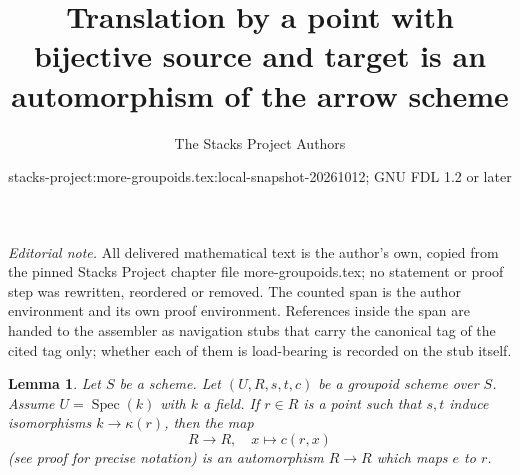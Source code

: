 \documentclass{stacks-project}
\title{Translation by a point with bijective source and target is an automorphism of the arrow scheme}
\author{The Stacks Project Authors}
\date{stacks-project:more-groupoids.tex:local-snapshot-20261012; GNU FDL 1.2 or later}
\theoremstyle{plain}
\newtheorem{lemma}[subsection]{Lemma}
\theoremstyle{definition}
\theoremstyle{remark}
\numberwithin{equation}{subsection}
\def\Spec{\mathop{\mathrm{Spec}}}
\begin{document}
\maketitle
\setcounter{subsection}{1}
\noindent\textit{Editorial note.} All delivered mathematical text is the author's own, copied from the pinned Stacks Project chapter file more-groupoids.tex; no statement or proof step was rewritten, reordered or removed. The counted span is the author environment and its own proof environment. References inside the span are handed to the assembler as navigation stubs that carry the canonical tag of the cited tag only; whether each of them is load-bearing is recorded on the stub itself.\par\medskip
\begin{lemma}
\label{lemma-groupoid-on-field-move-point}
Let $S$ be a scheme. Let $(U, R, s, t, c)$ be a groupoid scheme
over $S$. Assume $U = \Spec(k)$ with $k$ a field.
If $r \in R$ is a point such that $s, t$ induce
isomorphisms $k \to \kappa(r)$, then the map
$$
R \longrightarrow R, \quad
x \longmapsto c(r, x)
$$
(see proof for precise notation) is an automorphism $R \to R$
which maps $e$ to $r$.
\end{lemma}
\end{document}
